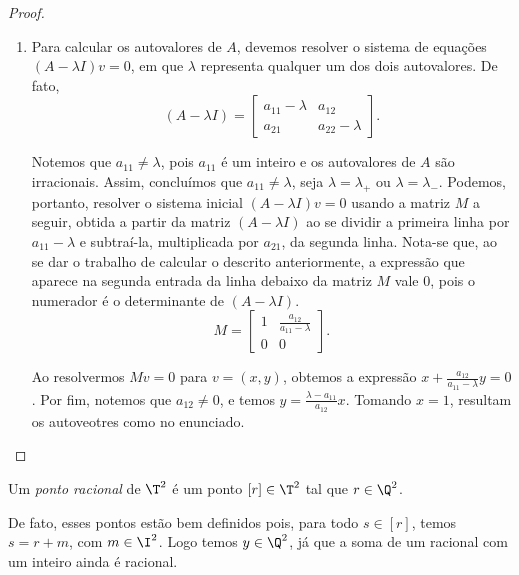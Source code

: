 \begin{proof}
\begin{enumerate}
	\item Para calcular os autovalores de $A$, devemos resolver o sistema de equações $(A-\lambda I)v = 0$, em que $\lambda$ representa qualquer um dos dois autovalores. De fato,
	\begin{equation*}
		(A-\lambda I) = \begin{bmatrix}
		a_{11} - \lambda & a_{12} \\
		a_{21} & a_{22} - \lambda
		\end{bmatrix} \text{.}
		\end{equation*}

Notemos que $a_{11} \neq \lambda$, pois $a_{11}$ é um inteiro e os autovalores de $A$ são irracionais. Assim, concluímos que $a_{11} \neq \lambda$, seja $\lambda = \lambda_{+}$ ou $\lambda = \lambda_{-}$. Podemos, portanto, resolver o sistema inicial $(A-\lambda I)v = 0$ usando a matriz $M$ a seguir, obtida a partir da matriz $(A-\lambda I)$ ao se dividir a primeira linha por $a_{11}-\lambda$ e subtraí-la, multiplicada por $a_{21}$, da segunda linha. Nota-se que, ao se dar o trabalho de calcular o descrito anteriormente, a expressão que aparece na segunda entrada da linha debaixo da matriz $M$ vale $0$, pois o numerador é o determinante de $(A-\lambda I)$.
	\begin{equation*}
		M = \begin{bmatrix}
		1 & \frac{a_{12}}{a_{11}-\lambda} \\
		0 & 0
		\end{bmatrix} \text{.}
		\end{equation*}

Ao resolvermos $Mv = 0$ para $v = (x,y)$, obtemos a expressão $x + \frac{a_{12}}{a_{11}-\lambda}y = 0$. Por fim, notemos que $a_{12} \neq 0$, e temos $y = \frac{\lambda-a_{11}}{a_{12}}x$. Tomando $x = 1$, resultam os autoveotres como no enunciado.
	\end{enumerate}
\end{proof}

\begin{definition}
Um \textit{ponto racional} de $\T^2$ é um ponto $[r] \in \T^2$ tal que $r \in \Q^2$.
\end{definition}
De fato, esses pontos estão bem definidos pois, para todo $s \in [r]$, temos $s = r + m$, com $m \in \I^2$. Logo temos $y \in \Q^2$, já que a soma de um racional com um inteiro ainda é racional.

